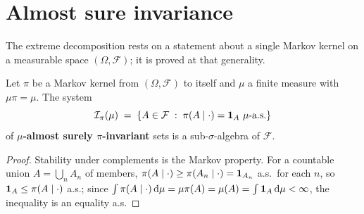 \section{Almost sure invariance}

The extreme decomposition rests on a statement about a single Markov kernel on a measurable space
$(\Omega,\mathcal F)$; it is proved at that generality.

\begin{definition}
    \label{def:ext-ae-invariant}
    \leanok

    Let $\pi$ be a Markov kernel from $(\Omega,\mathcal F)$ to itself and $\mu$ a finite measure
    with $\mu\pi = \mu$. The system
    \[\mathcal I_\pi(\mu) \;=\; \set{A \in \mathcal F \;:\; \pi(A \mid \cdot) = \1_A \ \mu\text{-a.s.}}\]
    of \textbf{$\mu$-almost surely $\pi$-invariant} sets is a sub-$\sigma$-algebra of $\mathcal F$.
\end{definition}
\begin{proof}
    \leanok

    Stability under complements is the Markov property. For a countable union $A = \bigcup_n A_n$
    of members, $\pi(A \mid \cdot) \geq \pi(A_n \mid \cdot) = \mathbf{1}_{A_n}$ a.s.\ for each $n$, so
    $\mathbf{1}_A \leq \pi(A \mid \cdot)$ a.s.; since $\int \pi(A\mid\cdot)\,\mathrm{d}\mu = \mu\pi(A) = \mu(A) =
    \int \mathbf{1}_A \,\mathrm{d}\mu < \infty$, the inequality is an equality a.s.
\end{proof}

